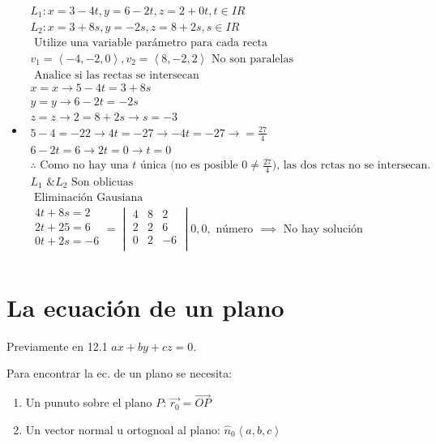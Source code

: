 \begin{itemize}
     \item \begin{align*}
        L_1:  x = 3-4t, y = 6-2t, z= 2+ 0t, t \in IR\\  
         L_2:  x = 3+ 8s, y = -2s, z = 8+2s, s \in IR \\ 
         \text{  Utilize una variable parámetro para cada recta  } \\ 
         v_1 = \left\langle -4,-2,0 \right\rangle , v_2 = \left\langle 8,-2,2 \right\rangle \text{  No son paralelas  } \\ 
         \text{  Analice si las rectas se intersecan  } \\ 
         x=x \rightarrow 5-4t=3+8s \\ 
         y=y \rightarrow 6-2t=-2s \\ 
         z=z \rightarrow 2 = 8 + 2s \rightarrow s = -3 \\ 
         5-4=-22 \rightarrow 4t=-27 \rightarrow -4t=-27 \rightarrow = \frac{27}{4} \\ 
         6-2t = 6 \rightarrow 2t = 0 \rightarrow t=0 \\ 
         \therefore \text{  Como no hay una $t$ única (no es posible $0 \neq \frac{27}{4} $), las dos rctas no se intersecan.  } \\ 
         L_1 \text{  \&  }L_2 \text{  Son oblicuas  } \\ 
         \text{  Eliminación Gausiana  } \\ 
         \begin{matrix}
             4t+8s = 2 \\ 
             2t+25 = 6 \\ 
             0t + 2s = -6 \\ 
         \end{matrix} = 
         \begin{vmatrix}
             4 & 8 & 2 \\ 
             2 & 2 & 6 \\ 
             0 & 2 & -6 \\ 
         \end{vmatrix} 
         0,0,\text{  número  } \implies \text{  No hay solución  } \\ 
     \end{align*}
\end{itemize}


\section{La ecuación de un plano}
Previamente en 12.1 $ax+by+cz = 0$.
\begin{figure}[htbp]
    \centering
    \caption{}
    \label{}
\end{figure}
Para encontrar la ec. de un plano se necesita:
    \begin{enumerate}
        \item Un punuto sobre el plano $P$: $\vec{r_0}=\overrightarrow{OP}$
        \item Un vector normal u ortognoal al plano: $\hat{n}_0 \left\langle a,b,c \right\rangle $
    \end{enumerate}
